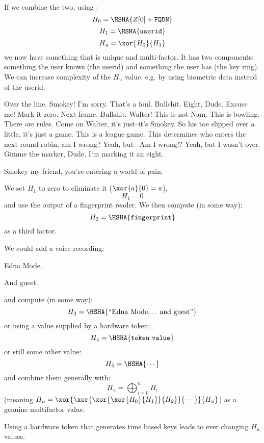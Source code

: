 \par
If we combine the two, using \XOR:
\[H_0 = \HSHA{Z[0] + \mathtt{FQDN}}\]
\[H_1 = \HSHA{\mathtt{userid}}\]
\[H_u = \xor{H_0}{H_1}\]
we now have something that is unique and multi-factor.
It has two components: something the user knows (the userid) and something the user has (the key ring).
We can increase complexity of the \(H_u\) value,
e.g. by using biometric data instead of the userid.
\begin{dialogue}
 Over the line, Smokey!  I'm sorry.  That's a foul.
 Bullshit.  Eight, Dude.
 Excuse me!  Mark it zero.  Next frame.
 Bullshit, Walter!
 This is not Nam.  This is bowling.  There are rules.
 Come on Walter, it's just--it's Smokey.  So his toe slipped over a little, it's just a game.
 This is a league game.  This determines who enters the next round-robin, am I wrong?
 Yeah, but--
 Am I wrong!?
 Yeah, but I wasn't over.  Gimme the marker, Dude,  I'm marking it an eight.
\par\medskip{}
 Smokey my friend, you're entering a world of pain.
\end{dialogue}
We set \(H_1\) to zero to eliminate it (\(\xor{a}{0} = a\)),
\[H_1 = 0\]
and use the output of a fingerprint reader.
We then compute (in some way):
\[H_2 = \HSHA{\mathtt{fingerprint}}\]
as a third factor.
\par
We could add a voice recording:
\begin{dialogue}
	 Edna Mode.
\par\medskip{}
 And guest.
\par\medskip{}
\end{dialogue}
and compute (in some way):
\[H_3 = \HSHA{\text{``Edna\ Mode\ldots\ and\ guest''}}\]
or using a value supplied by a hardware token:
\[H_4 = \HSHA{\mathtt{token\ value}}\]
or still some other value:
\[H_5 = \HSHA{\cdots}\]
and combine them generally with:
\[H_u = \bigoplus_{i=0}^n H_i\]
(meaning \(H_u = \xor{\xor{\xor{\xor{H_0}{H_1}}{H_2}}{\cdots}}{H_n}\))
as a genuine multifactor value.
\par
Using a hardware token that generates time based keys leads to ever changing \(H_u\) values.
